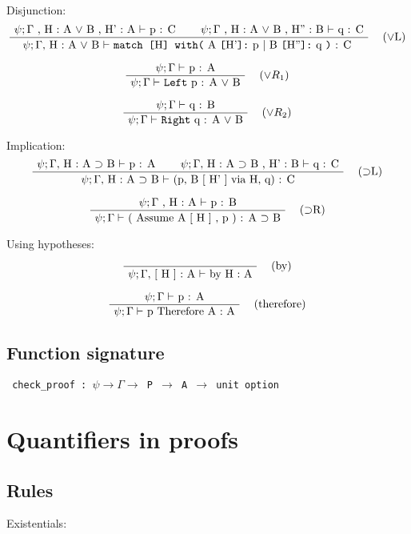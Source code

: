 \documentclass[twoside,a4paper]{article}
\theoremstyle{definition}
\begin{document}
Disjunction:
\[
\AxiomC{$\psi ; \Gamma$ , H : A $ \vee$ B , H' : A $\vdash$ p : C}
\AxiomC{$\psi ; \Gamma$ , H : A $ \vee$ B , H'' : B $\vdash$ q : C}
\RightLabel{\quad ($\vee$L)}
\BinaryInfC{$\psi ; \Gamma ,$  H : A
$ \vee$ B $\vdash $
 {\tt  match [}H{\tt] with(}
 A {\tt [}H'{\tt ]:} p
 | B {\tt [}H''{\tt ]:} q {\tt)} : C
}
\DisplayProof
\]

\[
\AxiomC{$\psi ; \Gamma \vdash$ p : A}
\RightLabel{\quad ($\vee R_1$)}
\UnaryInfC{$\psi ; \Gamma \vdash$ {\tt Left} p : A $\vee$ B}
\DisplayProof
\]

\[
\AxiomC{$\psi ; \Gamma \vdash$ q : B}
\RightLabel{\quad ($\vee R_2$)}
\UnaryInfC{$\psi ; \Gamma \vdash$ {\tt Right} q :  A $\vee$ B}
\DisplayProof
\]

Implication:
\[
\AxiomC{$\psi ; \Gamma ,$ H : A $\supset$ B $\vdash$ p : A}
\AxiomC{$\psi ; \Gamma ,$ H : A $\supset$ B , H' : B $\vdash$ q : C}
\RightLabel{\quad ($\supset$L)}
\BinaryInfC{$\psi ; \Gamma ,$ H : A $\supset$ B $\vdash$
(p, B [ H' ] via H, q) : C}
\DisplayProof
\]

\[
\AxiomC{$\psi ; \Gamma$ , H : A $\vdash$ p : B}
\RightLabel{\quad ($\supset$R)}
\UnaryInfC{$\psi ; \Gamma \vdash$ ( Assume A [ H ] , p ) : A
$\supset$ B}
\DisplayProof
\]

Using hypotheses:

\[
\AxiomC{}
\RightLabel{\quad (by)}
\UnaryInfC{$\psi ; \Gamma , $ [ H ] : A $\vdash$ by H : A}
\DisplayProof
\]

\[
\AxiomC{$\psi ; \Gamma \vdash$ p : A}
\RightLabel{\quad (therefore)}
\UnaryInfC{$\psi ; \Gamma \vdash$ p Therefore A : A}
\DisplayProof
\]

\subsection{Function signature}
\begin{center}
{\tt
check_proof : $\psi \rightarrow \Gamma \rightarrow $ P
$\rightarrow$ A $\rightarrow$ unit option
}
\end{center}

\section{Quantifiers in proofs}

\subsection{Rules}
Existentials:
\end{document}
